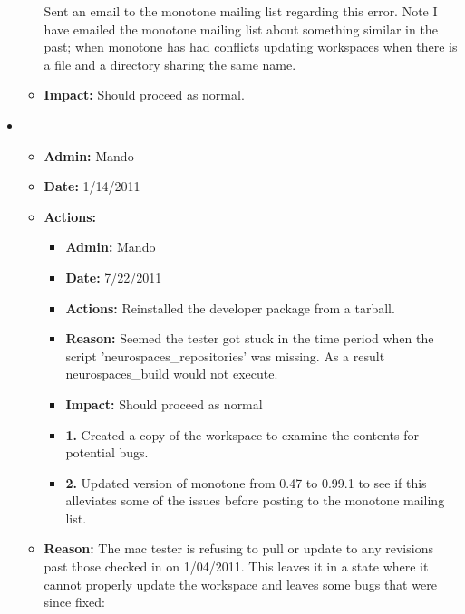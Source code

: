 \documentclass[12pt]{article}
\begin{document}
\begin{itemize}
\begin{itemize}
Sent an email to the monotone mailing list regarding this error. Note I have emailed the monotone mailing list about something similar in the past; when monotone has had conflicts updating workspaces when there is a file and a directory sharing the same name. 

\item[] {\bf Impact:}  Should proceed as normal.
\end{itemize}


\item 
\begin{itemize}
\item[] {\bf Admin:} Mando
\item[] {\bf Date:} 1/14/2011
\item[] {\bf Actions:} 


\begin{itemize}
\item[] {\bf Admin:} Mando
\item[] {\bf Date:} 7/22/2011
\item[] {\bf Actions:} Reinstalled the developer package from a tarball.
\item[] {\bf Reason:}  Seemed the tester got stuck in the time period when the script 'neurospaces\_repositories' was missing. As a result neurospaces\_build would not execute.
\item[] {\bf Impact:}  Should proceed as normal
\end{itemize}


\begin{itemize}
\item[] {\bf 1.} Created a copy of the workspace to examine the contents for potential bugs. 
\item[] {\bf 2.} Updated version of monotone from 0.47 to 0.99.1 to see if this alleviates some of the issues before posting to the monotone mailing list.
\end{itemize}

\item[] {\bf Reason:}  The mac tester is refusing to pull or update to any revisions past those checked in on 1/04/2011. This leaves it in a state where it cannot properly update the workspace and leaves some bugs that were since fixed:


\end{itemize}
\end{itemize}
\end{document}
